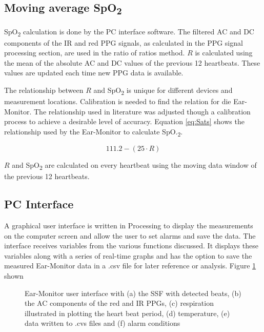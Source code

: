 \subsection{Moving average SpO\textsubscript{2}}
SpO\textsubscript{2} calculation is done by the PC interface software. The filtered AC and DC components of the IR and red PPG signals, as calculated in the PPG signal processing section, are used in the ratio of ratios method. $R$ is calculated using the mean of the absolute AC and DC values of the previous 12 heartbeats. These values are updated each time new PPG data is available.

\medskip

The relationship between $R$ and SpO\textsubscript{2} is unique for different devices and measurement locations. Calibration is needed to find the relation for die Ear-Monitor. The relationship used in literature \citep{ti2012application} was adjusted though a calibration process to achieve a desirable level of accuracy. Equation \ref{eq:Sats} shows the relationship used by the Ear-Monitor to calculate SpO.\textsubscript{2}.

\begin{equation}
\label{eq:Sats}
111.2-(25\cdot R)
\end{equation}

$R$ and SpO\textsubscript{2} are calculated on every heartbeat using the moving data window of the previous 12 heartbeats.

\subsection{PC Interface}
A graphical user interface is written in Processing to display the measurements on the computer screen and allow the user to set alarms and save the data. The interface receives variables from the various functions discussed. It displays these variables along with a series of real-time graphs and has the option to save the measured Ear-Monitor data in a .csv file for later reference or analysis. Figure \ref{fig:GUI} shown 

\begin{figure}[H]
\centering
\graphicspath{{figs/}}

\caption{Ear-Monitor user interface with (a) the SSF with detected beats, (b) the AC components of the red and IR PPGs, (c) respiration illustrated in plotting the heart beat period, (d) temperature, (e) data written to .cvs files and (f) alarm conditions}
\label{fig:GUI}
\end{figure}